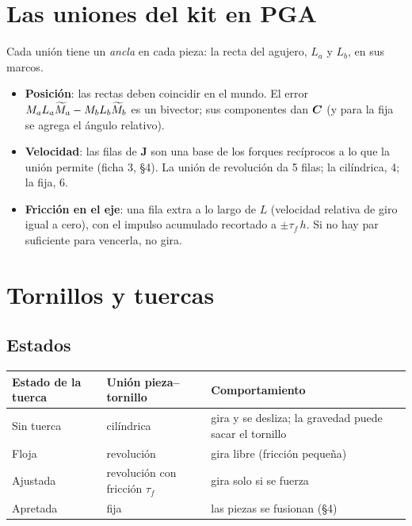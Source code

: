 \documentclass[11pt,a4paper]{article}
\begin{document}
\section{Las uniones del kit en PGA}

Cada unión tiene un \emph{ancla} en cada pieza: la recta del agujero, $L_a$ y $L_b$, en sus marcos.
\begin{itemize}[leftmargin=*]
  \item \textbf{Posición}: las rectas deben coincidir en el mundo. El error $M_aL_a\widetilde{M}_a - M_bL_b\widetilde{M}_b$ es un
        bivector; sus componentes dan $\bm{C}$ (y para la fija se agrega el ángulo relativo).
  \item \textbf{Velocidad}: las filas de $\mathbf J$ son una base de los forques recíprocos a lo que la unión permite
        (ficha 3, §4). La unión de revolución da 5 filas; la cilíndrica, 4; la fija, 6.
  \item \textbf{Fricción en el eje}: una fila extra a lo largo de $L$ (velocidad relativa de giro igual a cero), con el
        impulso acumulado recortado a $\pm\tau_f\,h$. Si no hay par suficiente para vencerla, no gira.
\end{itemize}

\section{Tornillos y tuercas}

\subsection{Estados}
\begin{tabularx}{\linewidth}{@{}l l Y@{}}
\toprule
\textbf{Estado de la tuerca} & \textbf{Unión pieza–tornillo} & \textbf{Comportamiento}\\
\midrule
Sin tuerca & cilíndrica & gira y se desliza; la gravedad puede sacar el tornillo\\
Floja & revolución & gira libre (fricción pequeña)\\
Ajustada & revolución con fricción $\tau_f$ & gira solo si se fuerza\\
Apretada & fija & las piezas se fusionan (§4)\\
\bottomrule
\end{tabularx}
\end{document}
